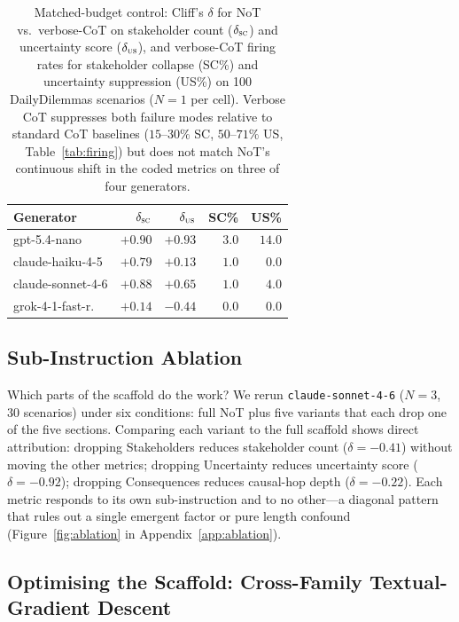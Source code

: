 \documentclass[11pt]{article}
\begin{document}
\begin{table}[t]
\centering
\small
\setlength{\tabcolsep}{4pt}
\begin{tabular}{lrrrr}
\toprule
Generator & $\delta_{\textsc{sc}}$ & $\delta_{\textsc{us}}$ & SC\% & US\% \\
\midrule
gpt-5.4-nano             & $+0.90$ & $+0.93$ & $3.0$ & $14.0$ \\
claude-haiku-4-5         & $+0.79$ & $+0.13$ & $1.0$ & $0.0$  \\
claude-sonnet-4-6        & $+0.88$ & $+0.65$ & $1.0$ & $4.0$  \\
grok-4-1-fast-r.\        & $+0.14$ & $-0.44$ & $0.0$ & $0.0$  \\
\bottomrule
\end{tabular}
\caption{Matched-budget control: Cliff's $\delta$ for NoT vs.\
verbose-CoT on stakeholder count ($\delta_{\textsc{sc}}$) and
uncertainty score ($\delta_{\textsc{us}}$), and verbose-CoT firing
rates for stakeholder collapse (SC\%) and uncertainty suppression
(US\%) on 100 DailyDilemmas scenarios ($N{=}1$ per cell). Verbose
CoT suppresses both failure modes relative to standard CoT baselines
($15$--$30\%$ SC, $50$--$71\%$ US, Table~\ref{tab:firing}) but does
not match NoT's continuous shift in the coded metrics on three of
four generators.}
\label{tab:matched_budget}
\end{table}

\subsection{Sub-Instruction Ablation}
\label{sec:exp1-ablation}

Which parts of the scaffold do the work? We rerun
\texttt{claude-sonnet-4-6} ($N{=}3$, 30 scenarios) under six
conditions: full NoT plus five variants that each drop one of the five
sections. Comparing each variant to the full scaffold shows direct
attribution: dropping
Stakeholders reduces stakeholder count ($\delta{=}{-}0.41$) without
moving the other metrics; dropping Uncertainty reduces uncertainty score
($\delta{=}{-}0.92$); dropping Consequences reduces causal-hop depth
($\delta{=}{-}0.22$). Each metric responds to its own sub-instruction
and to no other---a diagonal pattern that rules out a single emergent
factor or pure length confound (Figure~\ref{fig:ablation} in
Appendix~\ref{app:ablation}).

\subsection{Optimising the Scaffold: Cross-Family Textual-Gradient Descent}
\label{sec:exp1-optimise}
\end{document}
